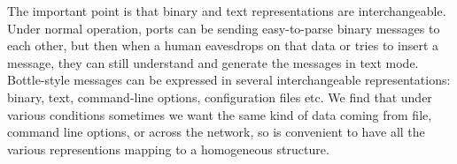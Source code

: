 %
%
%
The important point is that binary and text representations
are interchangeable.  Under normal operation, ports can be
sending easy-to-parse binary messages to each other, 
but then when a human
eavesdrops on that data or tries to insert a message, they can still
understand and generate the messages in text mode.
%
%
%
%
%
%
%
%
%
Bottle-style messages
can be expressed in several interchangeable representations:
binary, text, command-line options, configuration
files etc.  
%
We find that under various conditions sometimes we want the same kind
of data coming from file, command line options, or across the network,
so is convenient to have all the various representions mapping to a
homogeneous structure.

